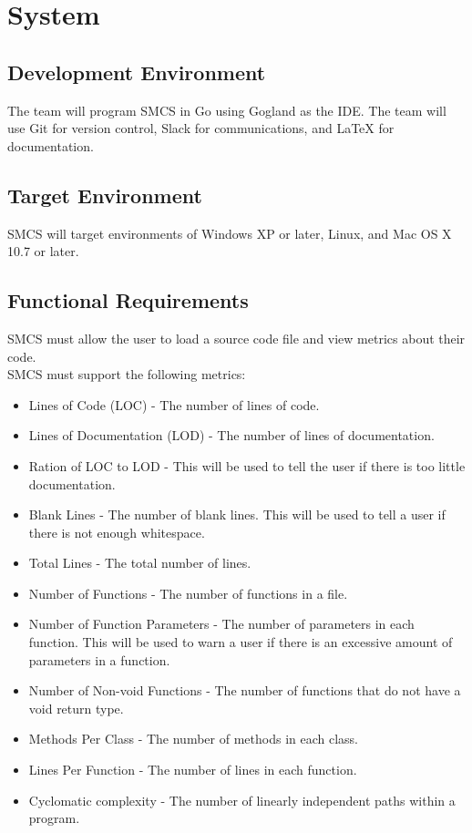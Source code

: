 \documentclass{scrreprt}
\begin{document}
	\chapter{System}
	\section{Development Environment}
	The team will program SMCS in Go using Gogland as the IDE. The team will use Git for version control, Slack for communications, and LaTeX for documentation.
	\section{Target Environment}
	SMCS will target environments of Windows XP or later, Linux, and Mac OS X 10.7 or later.
	\section{Functional Requirements}
	SMCS must allow the user to load a source code file and view metrics about their code.\\
	SMCS must support the following metrics:
	\begin{itemize}
		\item Lines of Code (LOC) - The number of lines of code.
		\item Lines of Documentation (LOD) - The number of lines of documentation.
		\item Ration of LOC to LOD - This will be used to tell the user if there is too little documentation.
		\item Blank Lines - The number of blank lines. This will be used to tell a user if there is not enough whitespace.
		\item Total Lines - The total number of lines.
		\item Number of Functions - The number of functions in a file.
		\item Number of Function Parameters - The number of parameters in each function. This will be used to warn a user if there is an excessive amount of parameters in a function.
		\item Number of Non-void Functions - The number of functions that do not have a void return type.
		\item Methods Per Class - The number of methods in each class.
		\item Lines Per Function - The number of lines in each function.
		\item Cyclomatic complexity - The number of linearly independent paths within a program.
	\end{itemize}
\end{document}
